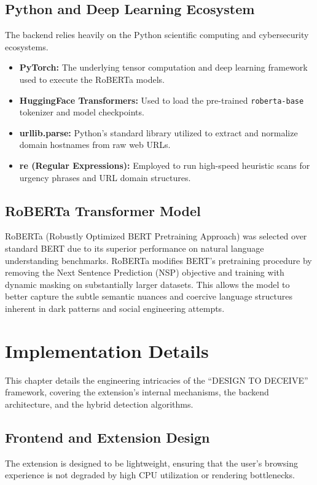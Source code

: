 \section{Python and Deep Learning Ecosystem}
The backend relies heavily on the Python scientific computing and cybersecurity ecosystems.
\begin{itemize}
    \item \textbf{PyTorch:} The underlying tensor computation and deep learning framework used to execute the RoBERTa models.
    \item \textbf{HuggingFace Transformers:} Used to load the pre-trained \texttt{roberta-base} tokenizer and model checkpoints.
    \item \textbf{urllib.parse:} Python's standard library utilized to extract and normalize domain hostnames from raw web URLs.
    \item \textbf{re (Regular Expressions):} Employed to run high-speed heuristic scans for urgency phrases and URL domain structures.
\end{itemize}

\section{RoBERTa Transformer Model}
RoBERTa (Robustly Optimized BERT Pretraining Approach) was selected over standard BERT due to its superior performance on natural language understanding benchmarks. RoBERTa modifies BERT's pretraining procedure by removing the Next Sentence Prediction (NSP) objective and training with dynamic masking on substantially larger datasets. This allows the model to better capture the subtle semantic nuances and coercive language structures inherent in dark patterns and social engineering attempts.

\chapter{Implementation Details}

This chapter details the engineering intricacies of the ``DESIGN TO DECEIVE'' framework, covering the extension's internal mechanisms, the backend architecture, and the hybrid detection algorithms.

\section{Frontend and Extension Design}
The extension is designed to be lightweight, ensuring that the user's browsing experience is not degraded by high CPU utilization or rendering bottlenecks.

